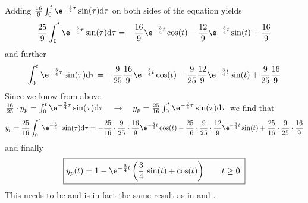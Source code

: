 %
Adding $\frac{16}{9} \int_0^t\e^{-\frac{3}{4}\tau} \sin(\tau) \mathrm{d}\tau$ on both
sides of the equation yields
%
\begin{align}
	\frac{25}{9}\int_0^t\e^{-\frac{3}{4}\tau}\sin(\tau)\mathrm{d}\tau=-\frac{16}{9}\e^{-\frac{3}{4}t}\cos(t)-\frac{12}{9}\e^{-\frac{3}{4}t}\sin(t)+\frac{16}{9} \nonumber
\end{align}
and further
\begin{align}
	\int_0^t\e^{-\frac{3}{4}\tau}\sin(\tau)\mathrm{d}\tau=-\frac{9}{25}\frac{16}{9}\e^{-\frac{3}{4}t}\cos(t)-\frac{9}{25}\frac{12}{9}\e^{-\frac{3}{4}t}\sin(t)+\frac{9}{25}\frac{16}{9} \nonumber
\end{align}
%
Since we know from above
$\frac{16}{25}\cdot y_p = \int_0^t\e^{-\frac{3}{4}\tau} \sin(\tau)\mathrm{d}\tau
\quad\rightarrow\quad
y_p = \frac{25}{16} \int_0^t\e^{-\frac{3}{4}\tau} \sin(\tau)\mathrm{d}\tau$
we find that
\begin{align}
	y_p = \frac{25}{16} \int_0^t\e^{-\frac{3}{4}\tau}\sin(\tau)\mathrm{d}\tau
	=-\frac{25}{16}\cdot\frac{9}{25}\cdot\frac{16}{9}\e^{-\frac{3}{4}t}\cos(t)-\frac{25}{16}\cdot\frac{9}{25}\cdot\frac{12}{9}\e^{-\frac{3}{4}t}\sin(t)+\frac{25}{16}\cdot\frac{9}{25}\cdot\frac{16}{9} \nonumber
\end{align}
and finally
\begin{align}
\boxed{
	y_p(t)=1-\e^{-\frac{3}{4}t}\left(\frac{3}{4}\,\sin(t)+\cos(t)\right) \qquad t \geq 0.}
\end{align}
%
This needs to be and is in fact the same result as in  and .

